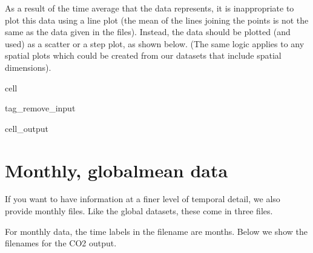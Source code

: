 \documentclass[letterpaper,10pt,english]{jupyterBook}
\begin{document}
\sphinxAtStartPar
As a result of the time average that the data represents,
it is inappropriate to plot this data
using a line plot
(the mean of the lines joining the points
is not the same as the data given in the files).
Instead, the data should be plotted (and used)
as a scatter or a step plot, as shown below.
(The same logic applies to any spatial plots
which could be created from our datasets
that include spatial dimensions).

\begin{sphinxuseclass}{cell}
\begin{sphinxuseclass}{tag_remove_input}\begin{sphinxVerbatimOutput}

\begin{sphinxuseclass}{cell_output}
\noindent{}

\end{sphinxuseclass}\end{sphinxVerbatimOutput}

\end{sphinxuseclass}
\end{sphinxuseclass}

\section{Monthly\sphinxhyphen{}, global\sphinxhyphen{}mean data}
\label{\detokenize{user-guide-historical:monthly-global-mean-data}}
\sphinxAtStartPar
If you want to have information at a finer level
of temporal detail, we also provide monthly files.
Like the global datasets, these come in three files.

\sphinxAtStartPar
For monthly data, the time labels in the filename are months.
Below we show the filenames for the CO2 output.
\end{document}
